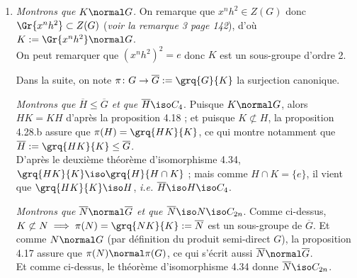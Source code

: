 \begin{enumerate}[resume]
    \item \emph{Montrons que $K \normal G$}. On remarque que $x^nh^2 \in Z(G)$ donc $\Gr{x^nh^2} \subset Z(G)$ (\textit{voir la remarque 3 page 142}), d'où $K:= \Gr{x^nh^2} \normal G$.\\
    On peut remarquer que $\left(x^nh^2\right)^2 = e$ donc $K$ est un sous-groupe d'ordre 2.

    Dans la suite, on note $\pi \colon G \to \overline{G}:= \grq{G}{K}$ la surjection canonique.

    \emph{Montrons que $\overline{H} \leq \overline{G}$ et que $\overline{H} \iso C_4$}. Puisque $K\normal G$, alors $HK = KH$ d'après la proposition 4.18 ; et puisque $K\not\subset H$,
    la proposition 4.28.b assure que $\pi(H) = \grq{HK}{K}$, ce qui montre notamment que $\overline{H}:= \grq{HK}{K} \leq \overline{G}$.\\
    D'après le deuxième théorème d'isomorphisme 4.34, $\grq{HK}{K} \iso \grq{H}{H\cap K}$ ; mais comme $H\cap K = \{e\}$, il vient que $\grq{HK}{K} \iso H$, \textit{i.e.} $\overline{H} \iso H \iso C_4$.\smallskip

    \emph{Montrons que $\overline{N} \normal \overline{G}$ et que $\overline{N} \iso N\iso C_{2n}$}. Comme ci-dessus, $K\not\subset N \implies \pi(N) = \grq{NK}{K}:=\overline{N} $ est un sous-groupe de $\overline{G}$.
    Et comme $N\normal G$ (par définition du produit semi-direct $G$), la proposition 4.17 assure que $\pi(N)\normal \pi(G)$, ce qui s'écrit aussi $\overline{N} \normal \overline{G}$.\\
    Et comme ci-dessus, le théorème d'isomorphisme 4.34 donne $\overline{N} \iso C_{2n}$.\smallskip


\end{enumerate}
